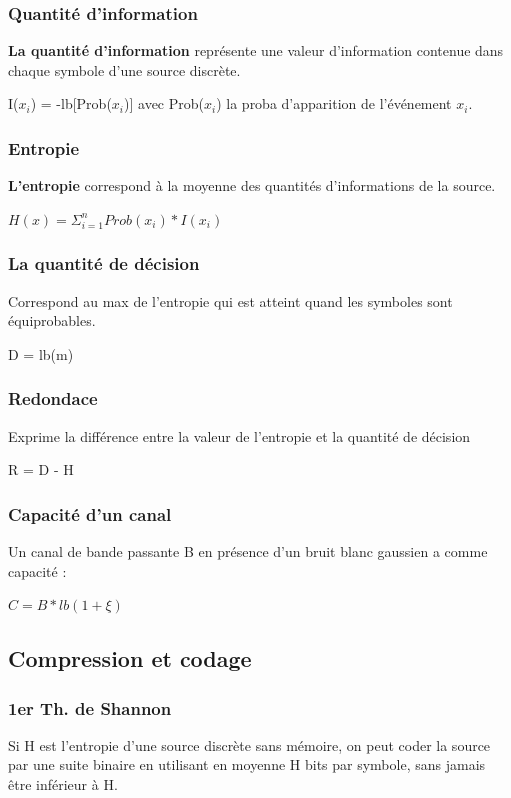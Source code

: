 \documentclass[12pt]{article}
\begin{document}
\subsubsection*{Quantité d'information}

\textbf{La quantité d'information} représente une valeur d'information contenue dans chaque symbole d'une source discrète.

\colorbox{blue!20}{I($x_i$) = -lb[Prob($x_i$)]} avec Prob($x_i$) la proba d'apparition de l'événement $x_i$.

\subsubsection*{Entropie}
\textbf{L'entropie} correspond à la moyenne des quantités d'informations de la source.

\colorbox{blue!20}{$H(x) = \Sigma_{i=1}^{n}Prob(x_i)*I(x_i)$}

\subsubsection*{La quantité de décision}
Correspond au max de l'entropie qui est atteint quand les symboles sont équiprobables.

\colorbox{blue!20}{D = lb(m)}

\subsubsection*{Redondace}

Exprime la différence entre la valeur de l'entropie et la quantité de décision

\colorbox{blue!20}{R = D - H}

\subsubsection*{Capacité d'un canal}
Un canal de bande passante B en présence d'un bruit blanc gaussien a comme capacité :

\colorbox{blue!20}{$C = B * lb(1+\xi)$}

\subsection*{Compression et codage}
\subsubsection*{1er Th. de Shannon}
Si H est l'entropie d'une source discrète sans mémoire, on peut coder la source par une suite binaire en utilisant en moyenne H bits par symbole, sans jamais être inférieur à H.
\vspace*{10pt}
\end{document}
